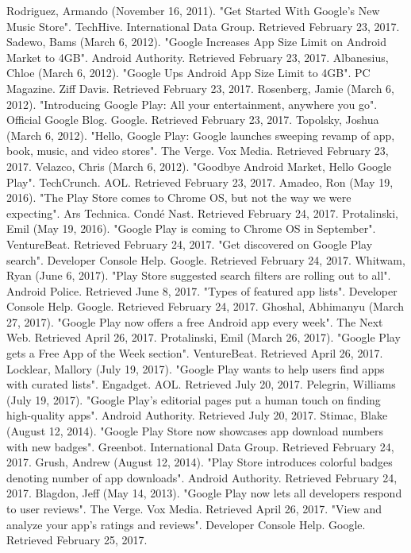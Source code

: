 \documentclass{article}                    %
\begin{document}
Rodriguez, Armando (November 16, 2011). "Get Started With Google's New Music Store". TechHive. International Data Group. Retrieved February 23, 2017.
Sadewo, Bams (March 6, 2012). "Google Increases App Size Limit on Android Market to 4GB". Android Authority. Retrieved February 23, 2017.
Albanesius, Chloe (March 6, 2012). "Google Ups Android App Size Limit to 4GB". PC Magazine. Ziff Davis. Retrieved February 23, 2017.
Rosenberg, Jamie (March 6, 2012). "Introducing Google Play: All your entertainment, anywhere you go". Official Google Blog. Google. Retrieved February 23, 2017.
Topolsky, Joshua (March 6, 2012). "Hello, Google Play: Google launches sweeping revamp of app, book, music, and video stores". The Verge. Vox Media. Retrieved February 23, 2017.
Velazco, Chris (March 6, 2012). "Goodbye Android Market, Hello Google Play". TechCrunch. AOL. Retrieved February 23, 2017.
Amadeo, Ron (May 19, 2016). "The Play Store comes to Chrome OS, but not the way we were expecting". Ars Technica. Condé Nast. Retrieved February 24, 2017.
Protalinski, Emil (May 19, 2016). "Google Play is coming to Chrome OS in September". VentureBeat. Retrieved February 24, 2017.
"Get discovered on Google Play search". Developer Console Help. Google. Retrieved February 24, 2017.
Whitwam, Ryan (June 6, 2017). "Play Store suggested search filters are rolling out to all". Android Police. Retrieved June 8, 2017.
"Types of featured app lists". Developer Console Help. Google. Retrieved February 24, 2017.
Ghoshal, Abhimanyu (March 27, 2017). "Google Play now offers a free Android app every week". The Next Web. Retrieved April 26, 2017.
Protalinski, Emil (March 26, 2017). "Google Play gets a Free App of the Week section". VentureBeat. Retrieved April 26, 2017.
Locklear, Mallory (July 19, 2017). "Google Play wants to help users find apps with curated lists". Engadget. AOL. Retrieved July 20, 2017.
Pelegrin, Williams (July 19, 2017). "Google Play's editorial pages put a human touch on finding high-quality apps". Android Authority. Retrieved July 20, 2017.
Stimac, Blake (August 12, 2014). "Google Play Store now showcases app download numbers with new badges". Greenbot. International Data Group. Retrieved February 24, 2017.
Grush, Andrew (August 12, 2014). "Play Store introduces colorful badges denoting number of app downloads". Android Authority. Retrieved February 24, 2017.
Blagdon, Jeff (May 14, 2013). "Google Play now lets all developers respond to user reviews". The Verge. Vox Media. Retrieved April 26, 2017.
"View and analyze your app's ratings and reviews". Developer Console Help. Google. Retrieved February 25, 2017.
\end{document}
